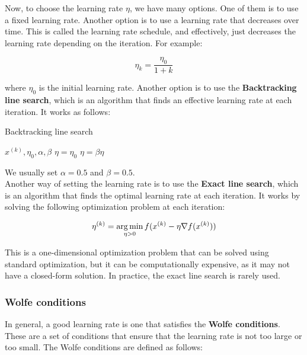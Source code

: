 Now, to choose the learning rate $\eta$, we have many options. One of them is to
use a fixed learning rate. Another option is to use a learning rate that decreases
over time. This is called the learning rate schedule, and effectively, just decreases
the learning rate depending on the iteration. For example:

\begin{equation}
    \eta_k = \frac{\eta_0}{1 + k}
\end{equation}

where $\eta_0$ is the initial learning rate. Another option is to use the \textbf{Backtracking
line search}, which is an algorithm that finds an effective learning rate at each iteration. It
works as follows:

\begin{algorithm}[H]
    \caption{Backtracking line search}
    \begin{algorithmic}[1]
        \Require $x^{(k)}, \eta_0, \alpha, \beta$
        \State $\eta = \eta_0$
            \State $\eta = \beta \eta$
        \EndWhile
    \end{algorithmic}
\end{algorithm}

We usually set $\alpha = 0.5$ and $\beta = 0.5$.\\

Another way of setting the learning rate is to use the \textbf{Exact line search}, which
is an algorithm that finds the optimal learning rate at each iteration. It works by solving
the following optimization problem at each iteration:

\begin{equation}
    \eta^{(k)} = \operatorname*{arg\,min}_{\eta > 0} f(x^{(k)} - \eta \nabla f(x^{(k)}))
\end{equation}

This is a one-dimensional optimization problem that can be solved using standard optimization,
but it can be computationally expensive, as it may not have a closed-form solution. In practice,
the exact line search is rarely used.

\subsubsection{Wolfe conditions}

In general, a good learning rate is one that satisfies the \textbf{Wolfe conditions}. These are a 
set of conditions that ensure that the learning rate is not too large or too small. The Wolfe
conditions are defined as follows:\\

